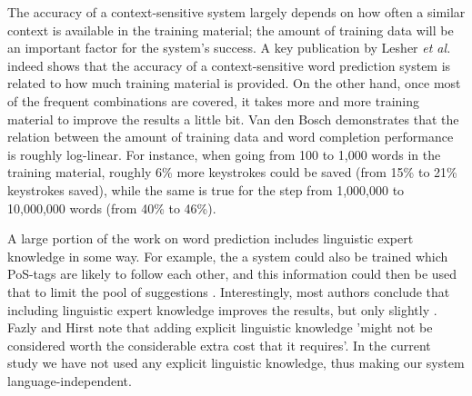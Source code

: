 \documentclass[12pt]{article}
\begin{document}
The accuracy of a context-sensitive system largely depends on how often a similar context is available in the training material; the amount of training data will be an important factor for the system's success. A key publication by Lesher {\em et al.} \citeyear{Lesher+99} indeed shows that the accuracy of a context-sensitive word prediction system is related to how much training material is provided. On the other hand, once most of the frequent combinations are covered, it takes more and more training material to improve the results a little bit. Van den Bosch \citeyear{vandenbosch11} demonstrates that the relation between the amount of training data and word completion performance is roughly log-linear. For instance, when going from 100 to 1,000 words in the training material, roughly 6\% more keystrokes could be saved (from 15\% to 21\% keystrokes saved), while the same is true for the step from 1,000,000 to 10,000,000 words (from 40\% to 46\%).

A large portion of the work on word prediction includes linguistic expert knowledge in some way. For example, the a system could also be trained which PoS-tags are likely to follow each other, and this information could then be used that to limit the pool of suggestions \cite{carlberger+97,Fazly+03,copestake97,Matiasek+02,garay-vitoria+97}. Interestingly, most authors conclude that including linguistic expert knowledge improves the results, but only slightly \cite{garay-vitoria+97,Fazly+03}. Fazly and Hirst \citeyear{Fazly+03} note that adding explicit linguistic knowledge 'might not be considered worth the considerable extra cost that it requires'. In the current study we have not used any explicit linguistic knowledge, thus making our system language-independent.

\end{document}

